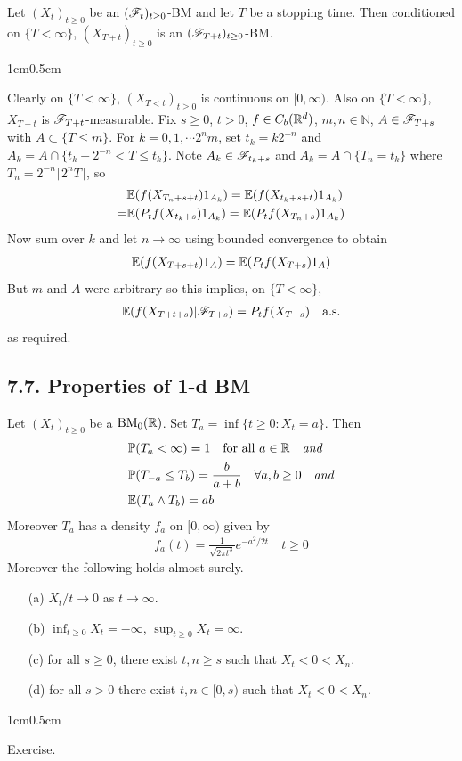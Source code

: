 \documentclass[12pt,a4paper]{report}
\newenvironment{proof}
{\begin{changemargin}{1cm}{0.5cm} 
	}%
	{\end{changemargin}
}
\begin{document}
 Let $(X_t)_{t\geq 0}$ be an $(\mathscr{F}_t)_{t\geq 0}$-BM and let $T$ be a stopping time. Then conditioned on $\{T<\infty \}$, $(X_{T+t})_{t\geq 0}$ is an $(\mathscr{F}_{T+t})_{t\geq 0}$-BM.
\begin{proof}
\pf Clearly on $\{T<\infty \}$, $(X_{T<t})_{t\geq 0}$ is continuous on $[0,\infty)$. Also on $\{T<\infty \}$, $X_{T+t}$ is $\mathscr{F}_{T+t}$-measurable. Fix $s\geq 0$, $t>0$, $f\in C_b(\mathbb{R}^d)$, $m,n\in \mathbb{N}$, $A\in \mathscr{F}_{T+s}$ with $A\subset \{T\leq m\}$. For $k=0,1,\cdots 2^{n}m$, set $t_k = k2^{-n}$ and $A_k = A \cap \{t_k -2^{-n}< T \leq t_k \}$. Note $A_k \in \mathscr{F}_{t_k +s}$ and $A_k = A \cap \{T_n = t_k \}$ where $T_n = 2^{-n} \lceil 2^n T \rceil$, so
\begin{align*}
& \mathbb{E}(f(X_{T_n + s+t}) 1_{A_k}) = \mathbb{E}(f(X_{t_k +s +t}) 1_{A_k}) \\
=& \mathbb{E}(P_t f(X_{t_k+s}) 1_{A_k}) = \mathbb{E}(P_t f(X_{T_n +s}) 1_{A_k})
\end{align*}
Now sum over $k$ and let $n\rightarrow \infty $ using bounded convergence to obtain
\begin{align*}
\mathbb{E}(f(X_{T+s+t})1_A) = \mathbb{E}( P_t f(X_{T+s}) 1_A)
\end{align*}
But $m$ and $A$ were arbitrary so this implies, on $\{ T< \infty \}$,
\begin{align*}
\mathbb{E} (f(X_{T+t+s}) |\mathscr{F}_{T+s}) = P_t f(X_{T+s}) \quad \text{a.s.}
\end{align*}
as required.

\eop
\end{proof}

\subsection*{7.7. Properties of 1-d BM}

 Let $(X_t)_{t\geq 0}$ be a $\text{BM}_0(\mathbb{R})$. Set $T_a = \inf \{t\geq 0 : X_t =a \}$. Then
\begin{align*}
& \mathbb{P}(T_a < \infty) =1 \quad \text{for all } a\in \mathbb{R} \quad \text{\emph{and}} \\
& \mathbb{P}(T_{-a} \leq T_b) = \frac{b}{a+b} \quad \forall a,b\geq 0 \quad \text{\emph{and}} \\
& \mathbb{E}(T_a \wedge T_b) = ab
\end{align*}
Moreover $T_a$ has a density $f_a$ on $[0,\infty)$ given by
\begin{align*}
f_a(t) = \frac{1}{\sqrt{2\pi t^3}} e^{-a^2/2t} \quad t\geq 0
\end{align*}
Moreover the following holds almost surely.
\begin{itemize}
\item[(a)] $X_{t} /t \rightarrow 0$ as $t\rightarrow \infty$.
\item[(b)] $\inf_{t\geq 0} X_t = -\infty$, $\sup_{t\geq 0} X_t =\infty$. 
\item[(c)] for all $s\geq 0$, there exist $t,n\geq s$ such that $X_t < 0 < X_n$.
\item[(d)] for all $s>0$ there exist $t,n \in [0,s)$ such that $X_t < 0<X_n$.
\end{itemize}
\begin{proof}
\pf Exercise.
\end{proof}
\s
\end{document}
